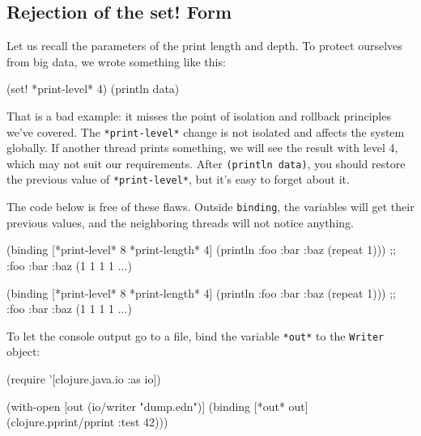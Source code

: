 \fi

\subsection{Rejection of the set! Form}

Let us recall the parameters of the print length and depth. To protect ourselves from big data, we wrote something like this:

\begin{clojure}
(set! *print-level* 4)
(println data)
\end{clojure}


That is a bad example: it misses the point of isolation and rollback principles we've covered.
The \verb|*print-level*| change is not isolated and affects the system globally.
If another thread prints something, we will see the result with level 4, which may not suit our requirements.
After \verb|(println data)|, you should restore the previous value of \verb|*print-level*|, but it's easy to forget about it.

The code below is free of these flaws.
Outside \verb|binding|, the variables will get their previous values, and the neighboring threads will not notice anything.

\ifx\DEVICETYPE\MOBILE

\begin{clojure}
(binding [*print-level* 8
          *print-length* 4]
  (println
    {:foo {:bar {:baz (repeat 1)}}}))
;; {:foo {:bar {:baz (1 1 1 1 ...)}}}
\end{clojure}

\else

\begin{clojure}
(binding [*print-level* 8
          *print-length* 4]
  (println {:foo {:bar {:baz (repeat 1)}}}))
;; {:foo {:bar {:baz (1 1 1 1 ...)}}}
\end{clojure}

\fi


To let the console output go to a file, bind the variable \verb|*out*| to the
\verb|Writer| object:


\begin{clojure}
(require '[clojure.java.io :as io])

(with-open [out (io/writer "dump.edn")]
  (binding [*out* out]
    (clojure.pprint/pprint {:test 42})))
\end{clojure}


